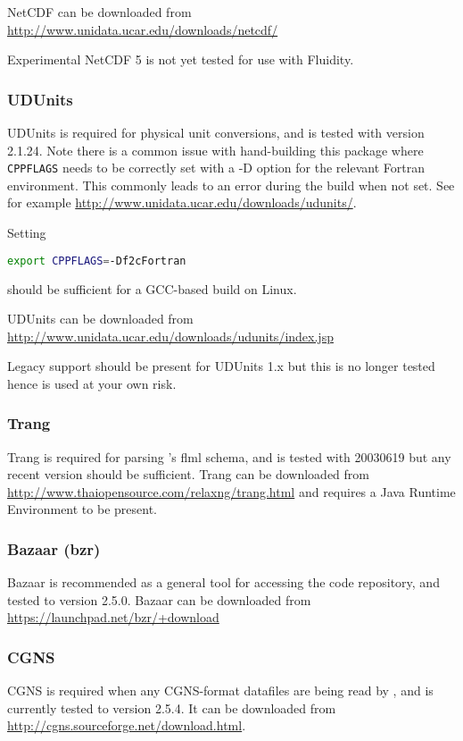NetCDF can be downloaded from \url{http://www.unidata.ucar.edu/downloads/netcdf/}

Experimental NetCDF 5 is not yet tested for use with Fluidity.

\subsubsection{UDUnits}
\label{sec:required_libraries_supporting_udunits}

UDUnits is required for physical unit conversions, and is tested with version
2.1.24. Note there is a common issue with hand-building this package where
\lstinline[language=bash]+CPPFLAGS+ needs to be correctly set with a -D
option for the relevant Fortran environment. This commonly leads to an error
during the build when not set. See for example
\url{http://www.unidata.ucar.edu/downloads/udunits/}.

Setting

\begin{lstlisting}[language=bash]
export CPPFLAGS=-Df2cFortran
\end{lstlisting}

should be sufficient for a GCC-based build on Linux.

UDUnits can be downloaded from \url{http://www.unidata.ucar.edu/downloads/udunits/index.jsp}

Legacy support should be present for UDUnits 1.x but this is no longer tested 
hence is used at your own risk.

\subsubsection{Trang}
\label{sec:required_libraries_supporting_trang}

Trang is required for parsing \fluidity's flml schema, and is tested with
20030619 but any recent version should be sufficient. Trang can be downloaded
from \url{http://www.thaiopensource.com/relaxng/trang.html} and requires a
Java Runtime Environment to be present.

\subsubsection{Bazaar (bzr)}
\label{sec:required_libraries_supporting_bzr}

Bazaar is recommended as a general tool for accessing the \fluidity code
repository, and tested to version 2.5.0. Bazaar can be
downloaded from \url{https://launchpad.net/bzr/+download}

\subsubsection{CGNS}
\label{sec:required_libraries_supporting_cgns}

CGNS is required when any CGNS-format datafiles are being read by \fluidity, and
is currently tested to version 2.5.4. It can be downloaded from 
\url{http://cgns.sourceforge.net/download.html}.
